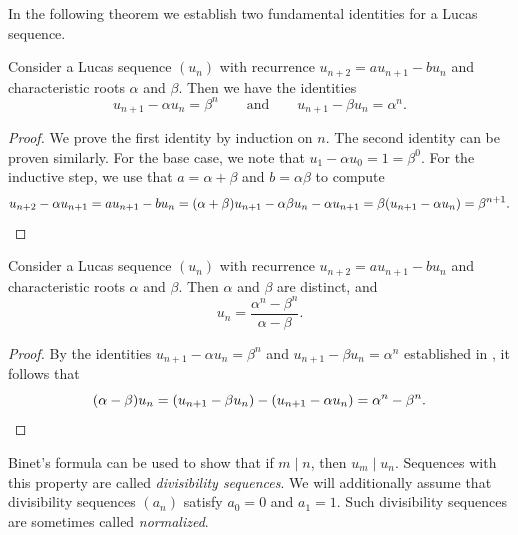 In the following theorem we establish two fundamental identities for a Lucas sequence.

\begin{theorem}\label{theorem:fundamental-identities-lucas-sequence}
  Consider a Lucas sequence $(u_n)$ with recurrence $u_{n+2}=au_{n+1}-bu_n$ and characteristic roots $\alpha$ and $\beta$. Then we have the identities
  \begin{equation*}
    u_{n+1}-\alpha u_n=\beta^n\qquad\text{and}\qquad u_{n+1}-\beta u_n=\alpha^n.
  \end{equation*}
\end{theorem}

\begin{proof}
  We prove the first identity by induction on $n$. The second identity can be proven similarly. For the base case, we note that $u_1-\alpha u_0=1=\beta^0$. For the inductive step, we use that $a=\alpha+\beta$ and $b=\alpha\beta$ to compute
  \begin{equation*}
    u_{n+2}-\alpha u_{n+1}=au_{n+1}-bu_n=(\alpha+\beta)u_{n+1}-\alpha\beta u_n-\alpha u_{n+1}=\beta(u_{n+1}-\alpha u_n)=\beta^{n+1}.\qedhere
  \end{equation*}
\end{proof}

\begin{theorem}\label{theorem:binets-formula}
  Consider a Lucas sequence $(u_n)$ with recurrence $u_{n+2}=au_{n+1}-bu_n$ and characteristic roots $\alpha$ and $\beta$. Then $\alpha$ and $\beta$ are distinct, and
  \begin{equation*}
    u_n=\frac{\alpha^n-\beta^n}{\alpha-\beta}.
  \end{equation*}
\end{theorem}

\begin{proof}
  By the identities $u_{n+1}-\alpha u_n=\beta^n$ and $u_{n+1}-\beta u_n=\alpha^n$ established in , it follows that
  \begin{equation*}
    (\alpha-\beta)u_n = (u_{n+1}-\beta u_n) - (u_{n+1}-\alpha u_n) = \alpha^n-\beta^n.\qedhere
  \end{equation*}
\end{proof}

Binet's formula can be used to show that if $m\mid n$, then $u_m\mid u_n$. Sequences with this property are called \emph{divisibility sequences}. We will additionally assume that divisibility sequences $(a_n)$ satisfy $a_0=0$ and $a_1=1$. Such divisibility sequences are sometimes called \emph{normalized}.

